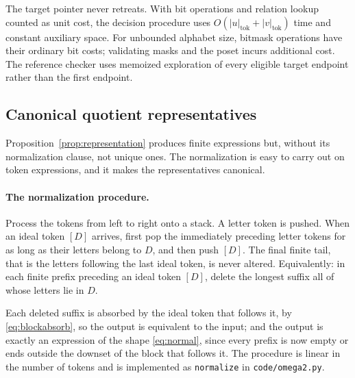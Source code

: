 \documentclass[11pt,a4paper]{article}
\numberwithin{equation}{section}
\theoremstyle{definition}
\theoremstyle{remark}
\begin{document}
The target pointer never retreats. With bit operations and relation lookup
counted as unit cost, the decision procedure uses
$O(|u|_{\mathrm{tok}}+|v|_{\mathrm{tok}})$ time and constant auxiliary space.
For unbounded alphabet size, bitmask operations have their ordinary bit
costs; validating masks and the poset incurs additional cost. The
reference checker uses memoized exploration of every eligible target
endpoint rather than the first endpoint.

\subsection{Canonical quotient representatives}
\label{sec:canonical}

Proposition~\ref{prop:representation} produces finite expressions but, without
its normalization clause, not unique ones. The normalization is easy to carry
out on token expressions, and it makes the representatives canonical.

\paragraph{The normalization procedure.}
Process the tokens from left to right onto a stack. A letter token is pushed.
When an ideal token $[D]$ arrives, first pop the immediately preceding letter
tokens for as long as their letters belong to $D$, and then push $[D]$.
The final finite tail, that is the letters following the last ideal token, is
never altered. Equivalently: in each finite prefix preceding an ideal token
$[D]$, delete the longest suffix all of whose letters lie in $D$.

Each deleted suffix is absorbed by the ideal token that follows it, by
\eqref{eq:blockabsorb}, so the output is equivalent to the input; and the
output is exactly an expression of the shape \eqref{eq:normal}, since every
prefix is now empty or ends outside the downset of the block that follows it.
The procedure is linear in the number of tokens and is implemented as
\texttt{normalize} in \texttt{code/omega2.py}.
\end{document}
